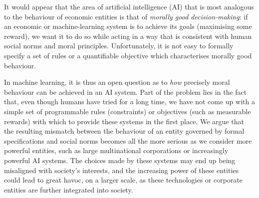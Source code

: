 \documentclass{amsart}
\theoremstyle{indented}
\theoremstyle{indentedProp}
\theoremstyle{indented}
\theoremstyle{indented}
\theoremstyle{indented}
\theoremstyle{indented}
\theoremstyle{indented}
\begin{document}
It would appear that the area of artificial intelligence (AI) that is most analogous to the behaviour of economic entities is that of {\it morally good decision-making}: if an economic or machine-learning system is to achieve its goals (maximising some reward), we want it to do so while acting in a way that is consistent with human social norms and moral principles. Unfortunately, it is
not easy to formally specify a set of rules or a quantifiable objective which
characterises morally good behaviour.

In machine learning, it is thus an open question as to {\it how} precisely moral behaviour can be achieved in an AI system. Part of the problem lies in the fact that, even though humans have tried for a long time, we have not come up with a simple set of programmable rules (constraints) or objectives (such as measurable rewards) with which to provide these systems in the first place. We argue that the resulting mismatch between the behaviour of an entity governed by formal specifications and social norms becomes all the more serious as we consider more powerful entities, such as large multinational corporations or increasingly powerful AI systems. The choices made by these systems may end up being misaligned with society's interests, and the increasing power of these entities could lead to great havoc, on a larger scale, as these technologies or corporate entities are further integrated into society.
\end{document}

